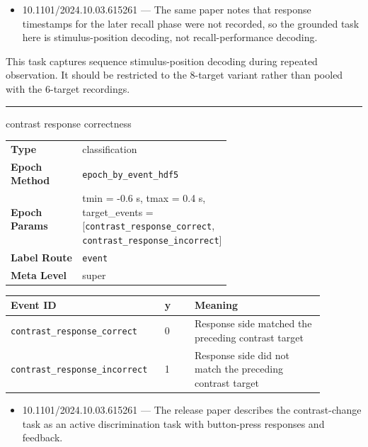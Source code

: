 {\begin{tcolorbox}
\begin{itemize}[leftmargin=1.3em,noitemsep,topsep=1pt]
\item[\scriptsize$\cdot$] {\scriptsize 10.1101/2024.10.03.615261 --- The same paper notes that response timestamps for the later recall phase were not recorded, so the grounded task here is stimulus-position decoding, not recall-performance decoding.}
\end{itemize}
\par{} {\footnotesize This task captures sequence stimulus-position decoding during repeated observation. It should be restricted to the 8-target variant rather than pooled with the 6-target recordings.}
\noindent\rule{\linewidth}{0.4pt}\par\nopagebreak
{} {\footnotesize contrast response correctness}\par\smallskip
{\footnotesize\begin{tabular}{@{}lp{0.62\linewidth}@{}}
\textbf{Type} & classification \\
\textbf{Epoch Method} & \texttt{epoch\_by\_event\_hdf5} \\
\textbf{Epoch Params} & tmin = -0.6 s, tmax = 0.4 s, target\_events = [\texttt{contrast\_response\_correct}, \texttt{contrast\_response\_incorrect}] \\
\textbf{Label Route} & \texttt{event} \\
\textbf{Meta Level} & super \\
\end{tabular}}
\par{}\par\smallskip
\begingroup\footnotesize
\begin{tabular}{@{}p{0.3911\linewidth}p{0.0978\linewidth}p{0.3911\linewidth}@{}}
\toprule
\textbf{Event ID} & \textbf{y} & \textbf{Meaning} \\
\midrule
\texttt{contrast\_response\_correct} & 0 & Response side matched the preceding contrast target \\
\texttt{contrast\_response\_incorrect} & 1 & Response side did not match the preceding contrast target \\
\bottomrule
\end{tabular}
\endgroup
\par{}\par
\begin{itemize}[leftmargin=1.3em,noitemsep,topsep=1pt]
\item[\scriptsize$\cdot$] {\scriptsize 10.1101/2024.10.03.615261 --- The release paper describes the contrast-change task as an active discrimination task with button-press responses and feedback.}

\end{itemize}
\end{tcolorbox}}
